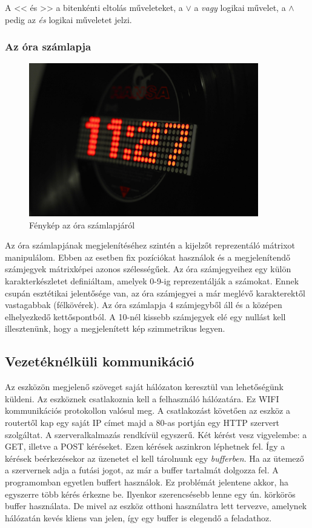 \documentclass[a4paper, 12pt]{article}
\begin{document}
\bigskip

\bigskip
A << és >> a bitenkénti eltolás műveleteket, a $\lor$ a \textit{vagy} logikai művelet, a $\land$ pedig az \textit{és} logikai műveletet jelzi.

\newpage

\subsubsection{Az óra számlapja}

\begin{figure}[ht]
	\centering
	\includegraphics[width = 10cm]{images/clockface.JPG}
	\caption{Fénykép az óra számlapjáról}
	\label{fig:clockface}
\end{figure}	

Az óra számlapjának megjelenítéséhez szintén a kijelzőt reprezentáló mátrixot manipulálom.
Ebben az esetben fix pozíciókat használok és a megjelenítendő számjegyek mátrixképei azonos szélességűek.
Az óra számjegyeihez egy külön karakterkészletet definiáltam, amelyek 0-9-ig reprezentálják a számokat. Ennek csupán esztétikai jelentősége van, az óra számjegyei a már meglévő karakterektől vastagabbak (félkövérek).
Az óra számlapja 4 számjegyből áll és a középen elhelyezkedő kettőspontból.
A 10-nél kissebb számjegyek elé egy nullást kell illesztenünk, hogy a megjelenített kép szimmetrikus legyen.

\subsection{Vezetéknélküli kommunikáció}
Az eszközön megjelenő szöveget saját hálózaton keresztül van lehetőségünk küldeni. Az eszköznek csatlakoznia kell a felhasználó hálózatára. Ez WIFI kommunikációs protokollon valósul meg. A csatlakozást követően az eszköz a routertől kap egy saját IP címet majd a 80-as portján egy HTTP szervert szolgáltat.
A szerveralkalmazás rendkívül egyszerű. Két kérést vesz vigyelembe: a GET, illetve a POST kéréseket.
Ezen kérések aszinkron léphetnek fel. Így a kérések beérkezésekor az üzenetet el kell tárolnunk egy \textit{bufferben}. Ha az ütemező a szervernek adja a futási jogot, az már a buffer tartalmát dolgozza fel.
A programomban egyetlen buffert használok. Ez problémát jelentene akkor, ha egyszerre több kérés érkezne be. Ilyenkor szerencsésebb lenne egy ún. körkörös buffer használata. De mivel az eszköz otthoni használatra lett tervezve, amelynek hálózatán kevés kliens van jelen, így egy buffer is elegendő a feladathoz.
\end{document}
